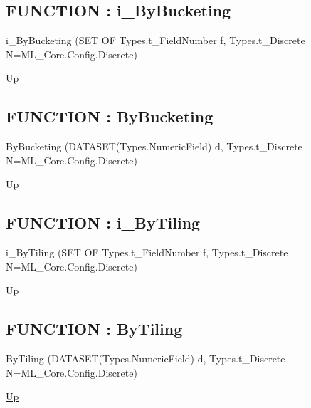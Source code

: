 \par
\par
\subsection*{FUNCTION : i\_ByBucketing}
\hypertarget{ecldoc:ml_core.discretize.i_bybucketing}{}
\begin{minipage}[t]{\textwidth}
\begin{flushleft}
 i\_ByBucketing (SET OF Types.t\_FieldNumber f, Types.t\_Discrete N=ML\_Core.Config.Discrete)
\end{flushleft}
\end{minipage}
\hyperlink{ecldoc:ML_Core.Discretize}{Up}

\par
\par
\subsection*{FUNCTION : ByBucketing}
\hypertarget{ecldoc:ml_core.discretize.bybucketing}{}
\begin{minipage}[t]{\textwidth}
\begin{flushleft}
 ByBucketing (DATASET(Types.NumericField) d, Types.t\_Discrete N=ML\_Core.Config.Discrete)
\end{flushleft}
\end{minipage}
\hyperlink{ecldoc:ML_Core.Discretize}{Up}

\par
\par
\subsection*{FUNCTION : i\_ByTiling}
\hypertarget{ecldoc:ml_core.discretize.i_bytiling}{}
\begin{minipage}[t]{\textwidth}
\begin{flushleft}
 i\_ByTiling (SET OF Types.t\_FieldNumber f, Types.t\_Discrete N=ML\_Core.Config.Discrete)
\end{flushleft}
\end{minipage}
\hyperlink{ecldoc:ML_Core.Discretize}{Up}

\par
\par
\subsection*{FUNCTION : ByTiling}
\hypertarget{ecldoc:ml_core.discretize.bytiling}{}
\begin{minipage}[t]{\textwidth}
\begin{flushleft}
 ByTiling (DATASET(Types.NumericField) d, Types.t\_Discrete N=ML\_Core.Config.Discrete)
\end{flushleft}
\end{minipage}
\hyperlink{ecldoc:ML_Core.Discretize}{Up}

